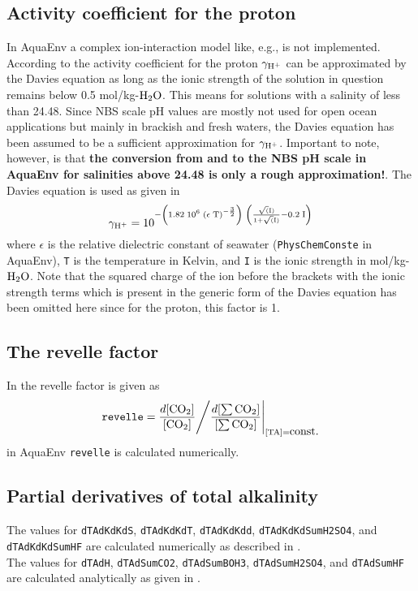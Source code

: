 \documentclass[a4paper]{article}
\begin{document}
\subsection{Activity coefficient for the proton}
In \textsf{AquaEnv} a complex ion-interaction model like, e.g., \citet{Millero1998} is not implemented.
According to \citet{Zeebe2001} the activity coefficient for the proton $\rm \gamma_{\rm H^+}$  can be approximated by the Davies equation as long as the ionic strength of the solution in question remains below 0.5 mol/kg-$\rm H_2O$. This means for solutions with a salinity of less than 24.48. Since NBS scale pH values are mostly not used for open ocean applications but mainly in brackish and fresh waters, the Davies equation has been assumed to be a sufficient approximation for $\rm \gamma_{\rm H^+}$. Important to note, however, is that \textbf{the conversion from and to the NBS pH scale in \textsf{AquaEnv} for salinities above 24.48 is only a rough approximation!}.
The Davies equation is used as given in \citet{Zeebe2001}
\begin{equation}
\rm \gamma_{\rm H^+}  =  10^{- \left(1.82 \; 10^6 \; \left(\epsilon \; T\right)^{-\frac{3}{2}}\right) \; \left( \frac{\sqrt(I)}{1 + \sqrt(I)} - 0.2 \; I\right)}
\end{equation}
where $\epsilon$ is the relative dielectric constant of seawater (\texttt{PhysChemConst\textdollar$ $e} in \textsf{AquaEnv}), \texttt{T} is the temperature in Kelvin, and \texttt{I} is the ionic strength in mol/kg-$\rm H_2O$. Note that the squared charge of the ion before the brackets with the ionic strength terms which is present in the generic form of the Davies equation has been omitted here since for the proton, this factor is 1.\\

\subsection{The revelle factor}
In \citet[p.73]{Zeebe2001} the revelle factor is given as
\begin{equation}
\mbox{\texttt{revelle}} = \frac{d [\rm CO_2]}{[\rm CO_2]} \Bigg/ \frac{d \rm [\sum CO_2]}{\rm [\sum CO_2]} \Bigg|_{[\rm TA] = \mbox{const.}}
\end{equation}
in \textsf{AquaEnv} \texttt{revelle} is calculated numerically.

\subsection{Partial derivatives of total alkalinity}
The values for \texttt{dTAdKdKdS}, \texttt{dTAdKdKdT}, \texttt{dTAdKdKdd}, \texttt{dTAdKdKdSumH2SO4}, and \texttt{dTAdKdKdSumHF} are calculated numerically as described in \citet{Hofmann2008b}.\\

\noindent
The values for \texttt{dTAdH},  \texttt{dTAdSumCO2}, \texttt{dTAdSumBOH3}, \texttt{dTAdSumH2SO4}, and  \texttt{dTAdSumHF}  are calculated analytically as given in \citet{Hofmann2008}.\\




\end{document}
